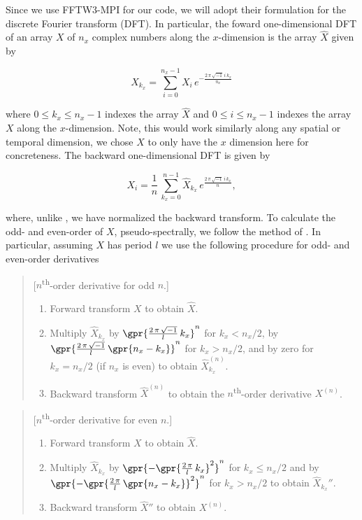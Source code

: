 Since we use FFTW3-MPI for our code, we will adopt their formulation for the discrete Fourier transform (DFT). \cite{Frigo05} In particular, the foward one-dimensional DFT of an array $X$ of $n_x$ complex numbers along the $x$-dimension is the array $\widehat{X}$ given by

\begin{equation}
	\widehat{X}_{k_x} = \sum_{i = 0}^{n_x-1} X_i\,e^{-\frac{2\,\pi\,\sqrt{-1}\,i\,k_x}{n_x}}
\end{equation}

where $0 \leq k_x \leq n_x - 1$ indexes the array $\widehat{X}$ and $0 \leq i \leq n_x - 1$ indexes the array $X$ along the $x$-dimension. Note, this would work similarly along any spatial or temporal dimension, we chose $X$ to only have the $x$ dimension here for concreteness. The backward one-dimensional DFT is given by

\begin{equation}
	X_i = \frac{1}{n}\,\sum_{k_x = 0}^{n-1} \widehat{X}_{k_x}\,e^{\frac{2\,\pi\,\sqrt{-1}\,i\,k_x}{n}},
\end{equation}

where, unlike \cite{Frigo05}, we have normalized the backward transform. To calculate the odd- and even-order of $X$, pseudo-spectrally, we follow the method of \cite{Johnson11}. In particular, assuming $X$ has period $l$ we use the following procedure for odd- and even-order derivatives

\begin{quote}[$n$\textsuperscript{th}-order derivative for odd $n$.]
	\begin{enumerate}[1.]
		\item Forward transform $X$ to obtain $\widehat{X}$.
		\item Multiply $\widehat{X}_{k_x}$ by $\gpr{\frac{2\,\pi\,\sqrt{-1}}{l}\,k_x}^n$ for $k_x < n_x/2$, by $\gpr{\frac{2\,\pi\,\sqrt{-1}}{l}\,\gpr{n_x - k_x}}^n$  for $k_x > n_x/2$, and by zero for $k_x = n_x/2$ (if $n_x$ is even) to obtain $\widehat{X}_{k_x}^{(n)}$.
		\item Backward transform $\widehat{X}^{(n)}$ to obtain the $n$\textsuperscript{th}-order derivative $X^{(n)}$.
	\end{enumerate}
\end{quote}

\begin{quote}[$n$\textsuperscript{th}-order derivative for even $n$.]
	\begin{enumerate}[1.]
		\item Forward transform $X$ to obtain $\widehat{X}$.
		\item Multiply $\widehat{X}_{k_x}$ by $\gpr{-\gpr{\frac{2\,\pi}{l}\,k_x}^2}^n$ for $k_x \leq n_x/2$ and by $\gpr{-\gpr{\frac{2\,\pi}{l}\,\gpr{n_x - k_x}}^2}^n$  for $k_x > n_x/2$ to obtain $\widehat{X}_{k_x}''$.
		\item Backward transform $\widehat{X}''$ to obtain $X^{(n)}$.
	\end{enumerate}
\end{quote}

